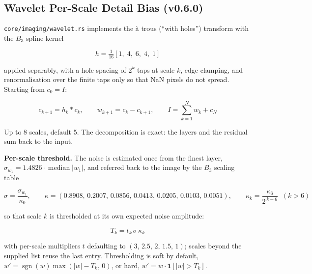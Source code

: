 \documentclass[11pt,a4paper]{article}
\newcommand{\code}[1]{\texttt{\small #1}}
\begin{document}
    \subsection{Wavelet Per-Scale Detail Bias (v0.6.0)}
    \label{sec:wavelet_bias}

    \code{core/imaging/wavelet.rs} implements the \`a trous (``with holes'') transform with the $B_3$ spline kernel

    \begin{equation}
        h = \tfrac{1}{16}\left[1,\; 4,\; 6,\; 4,\; 1\right]
    \end{equation}

    applied separably, with a hole spacing of $2^k$ taps at scale $k$, edge clamping, and renormalisation over the finite taps only so that NaN pixels do not spread. Starting from $c_0 = I$:

    \begin{equation}
        c_{k+1} = h_k * c_k, \qquad w_{k+1} = c_k - c_{k+1}, \qquad
        I = \sum_{k=1}^{N} w_k + c_N
    \end{equation}

    Up to 8 scales, default 5. The decomposition is exact: the layers and the residual sum back to the input.

    \textbf{Per-scale threshold.} The noise is estimated once from the finest layer, $\sigma_{w_1} = 1.4826 \cdot \operatorname{median}\left| w_1 \right|$, and referred back to the image by the $B_3$ scaling table

    \begin{equation}
        \sigma = \frac{\sigma_{w_1}}{\kappa_0}, \qquad
        \kappa = \left(0.8908,\, 0.2007,\, 0.0856,\, 0.0413,\, 0.0205,\, 0.0103,\, 0.0051\right),
        \qquad \kappa_k = \frac{\kappa_6}{2^{\,k-6}} \;\; (k > 6)
    \end{equation}

    so that scale $k$ is thresholded at its own expected noise amplitude:

    \begin{equation}
        \boxed{
            T_k = t_k \, \sigma \, \kappa_k
        }
    \end{equation}

    with per-scale multipliers $t$ defaulting to $(3,\, 2.5,\, 2,\, 1.5,\, 1)$; scales beyond the supplied list reuse the last entry. Thresholding is soft by default, $w' = \operatorname{sgn}(w)\max(\left| w \right| - T_k,\, 0)$, or hard, $w' = w \cdot \mathbf{1}\!\left[\left| w \right| > T_k\right]$.
\end{document}
